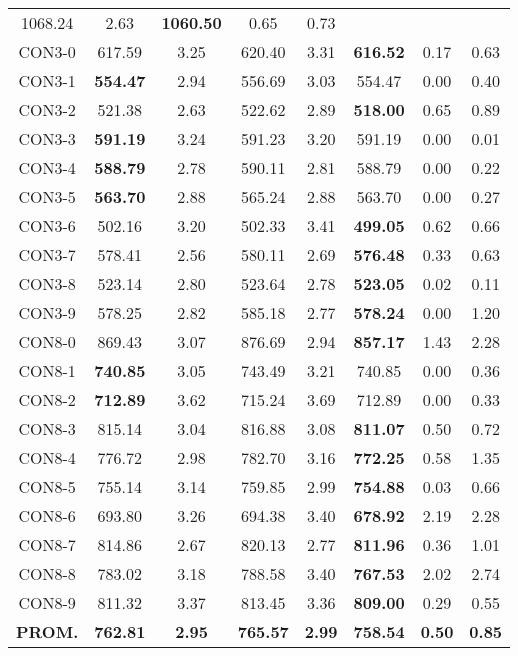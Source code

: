 \begin{table}[h]
\begin{tabular}{c c c c c c c c}
1068.24 & 2.63 & \bf{1060.50} & 
0.65 & 0.73\\CON3-0 & 617.59 & 3.25 & 
620.40 & 3.31 & \bf{616.52} & 
0.17 & 0.63\\CON3-1 & \bf{554.47} & 2.94 & 
556.69 & 3.03 & 554.47 & 0.00
 & 0.40\\CON3-2 & 521.38 & 2.63 & 
522.62 & 2.89 & \bf{518.00} & 
0.65 & 0.89\\CON3-3 & \bf{591.19} & 3.24 & 
591.23 & 3.20 & 591.19 & 0.00
 & 0.01\\CON3-4 & \bf{588.79} & 2.78 & 
590.11 & 2.81 & 588.79 & 0.00
 & 0.22\\CON3-5 & \bf{563.70} & 2.88 & 
565.24 & 2.88 & 563.70 & 0.00
 & 0.27\\CON3-6 & 502.16 & 3.20 & 
502.33 & 3.41 & \bf{499.05} & 
0.62 & 0.66\\CON3-7 & 578.41 & 2.56 & 
580.11 & 2.69 & \bf{576.48} & 
0.33 & 0.63\\CON3-8 & 523.14 & 2.80 & 
523.64 & 2.78 & \bf{523.05} & 
0.02 & 0.11\\CON3-9 & 578.25 & 2.82 & 
585.18 & 2.77 & \bf{578.24} & 
0.00 & 1.20\\CON8-0 & 869.43 & 3.07 & 
876.69 & 2.94 & \bf{857.17} & 
1.43 & 2.28\\CON8-1 & \bf{740.85} & 3.05 & 
743.49 & 3.21 & 740.85 & 0.00
 & 0.36\\CON8-2 & \bf{712.89} & 3.62 & 
715.24 & 3.69 & 712.89 & 0.00
 & 0.33\\CON8-3 & 815.14 & 3.04 & 
816.88 & 3.08 & \bf{811.07} & 
0.50 & 0.72\\CON8-4 & 776.72 & 2.98 & 
782.70 & 3.16 & \bf{772.25} & 
0.58 & 1.35\\CON8-5 & 755.14 & 3.14 & 
759.85 & 2.99 & \bf{754.88} & 
0.03 & 0.66\\CON8-6 & 693.80 & 3.26 & 
694.38 & 3.40 & \bf{678.92} & 
2.19 & 2.28\\CON8-7 & 814.86 & 2.67 & 
820.13 & 2.77 & \bf{811.96} & 
0.36 & 1.01\\CON8-8 & 783.02 & 3.18 & 
788.58 & 3.40 & \bf{767.53} & 
2.02 & 2.74\\CON8-9 & 811.32 & 3.37 & 
813.45 & 3.36 & \bf{809.00} & 
0.29 & 0.55\\\bf{PROM.} & 
\bf{762.81} & \bf{2.95} & \bf{765.57} & \bf{2.99} & \bf{758.54} & \bf{0.50} & \bf{0.85}\\[1ex]\hline
\end{tabular}
\label{table:nonlin}
\end{table}
